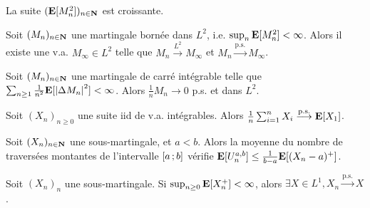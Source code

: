 \begin{rem}
	La suite $(\mathbf{E}[M_n^2])_{n \in \mathbf{N}}$ est croissante.
\end{rem}

\begin{thm}
	Soit $(M_n)_{n \in \mathbf{N}}$ une martingale bornée dans $L^2$, i.e. $\sup_n \mathbf{E}[M_n^2] < \infty$.
	Alors il existe une v.a. $M_\infty \in L^2$ telle que $M_n \overset{L^2}{\longrightarrow} M_\infty$ et $M_n \overset{\text{p.s.}}{\longrightarrow} M_\infty$.
\end{thm}

\begin{thm}
	Soit $(M_n)_{n \in \mathbf{N}}$ une martingale de carré intégrable telle que $\sum_{n \geq 1} \frac{1}{n^2} \mathbf{E}[\left\lvert\Delta M_n\right\rvert^2] < \infty$.
	Alors $\frac{1}{n} M_n \longrightarrow 0$ p.s. et dans $L^2$.
\end{thm}

\begin{thm}
	Soit $(X_n)_{n \geq 0}$ une suite iid de v.a. intégrables.
	Alors $\frac{1}{n} \sum_{i = 1}^n X_i \overset{\text{p.s.}}{\longrightarrow} \mathbf{E}[X_1]$.
\end{thm}

\begin{lem}
	Soit $(X_n)_{n \in \mathbf{N}}$ une sous-martingale, et $a < b$.
	Alors la moyenne du nombre de traversées montantes de l'intervalle $\mathopen{}\mathclose{\left[a\mathclose{}\mathpunct{};b\right]}$ vérifie $\mathbf{E}[U_n^{a,b}] \leq \frac{1}{b - a} \mathbf{E}[(X_n - a)^+]$.
\end{lem}

\begin{thm}
	Soit $(X_n)_n$ une sous-martingale.
	Si $\sup_{n \geq 0} \mathbf{E}[X_n^+] < \infty$, alors $\exists X \in L^1, X_n \overset{\text{p.s.}}{\longrightarrow}X$.
\end{thm}
